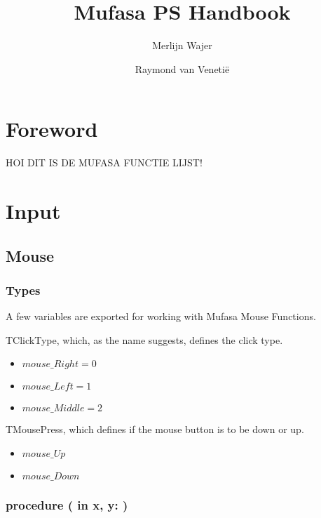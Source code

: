 \documentclass[a4paper]{report}
\begin{document}
\title{Mufasa PS Handbook}
\author{Merlijn Wajer \and Raymond van Veneti\"{e}}


\maketitle
\tableofcontents

\chapter{Foreword}

HOI DIT IS DE MUFASA FUNCTIE LIJST!

\chapter{Input}

\section{Mouse}

\subsection{Types}

A few variables are exported for working with Mufasa Mouse Functions.

TClickType, which, as the name suggests, defines the click type.
\begin{itemize}
	\item $mouse\_Right = 0$ 
	\item $mouse\_Left = 1$
	\item $mouse\_Middle = 2$
\end{itemize}

TMousePress, which defines if the mouse button is to be down or up.
\begin{itemize}
	\item $mouse\_Up$
	\item $mouse\_Down$
\end{itemize}


\subsection{\textbf{procedure} {\color{blue}{MoveMouse}}({\color{typeRed}
{in x, y: }}{\color{typeGreen}{Integer}})}
\end{document}

